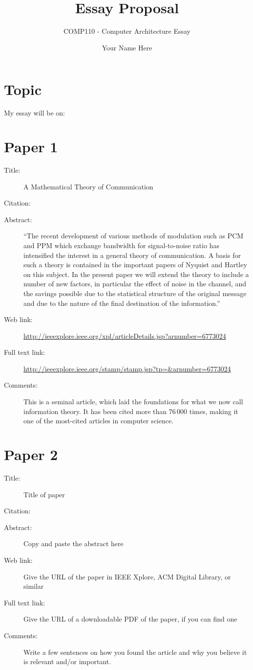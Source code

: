 \documentclass{scrartcl}
\title{Essay Proposal}
\subtitle{COMP110 - Computer Architecture Essay}
\author{Your Name Here}
\begin{document}
\maketitle

\section*{Topic}

My essay will be on:


\section*{Paper 1}
\begin{description}
\item[Title:] A Mathematical Theory of Communication
\item[Citation:] \cite{shannon}
\item[Abstract:] ``The recent development of various methods of modulation such as PCM and PPM which exchange bandwidth for signal-to-noise ratio has intensified the interest in a general theory of communication. A basis for such a theory is contained in the important papers of Nyquist and Hartley on this subject. In the present paper we will extend the theory to include a number of new factors, in particular the effect of noise in the channel, and the savings possible due to the statistical structure of the original message and due to the nature of the final destination of the information.''
\item[Web link:] \url{http://ieeexplore.ieee.org/xpl/articleDetails.jsp?arnumber=6773024}
\item[Full text link:] \url{http://ieeexplore.ieee.org/stamp/stamp.jsp?tp=&arnumber=6773024}
\item[Comments:] This is a seminal article, which laid the foundations for what we now call information theory.
	It has been cited more than $76\,000$ times, making it one of the most-cited articles in computer science.
\end{description}

\section*{Paper 2}
\begin{description}
\item[Title:] Title of paper
\item[Citation:] \cite{bibtex_key}
\item[Abstract:] Copy and paste the abstract here
\item[Web link:] Give the URL of the paper in IEEE Xplore, ACM Digital Library, or similar
\item[Full text link:] Give the URL of a downloadable PDF of the paper, if you can find one
\item[Comments:] Write a few sentences on how you found the article and why you believe it is relevant and/or important.
\end{description}
\end{document}
